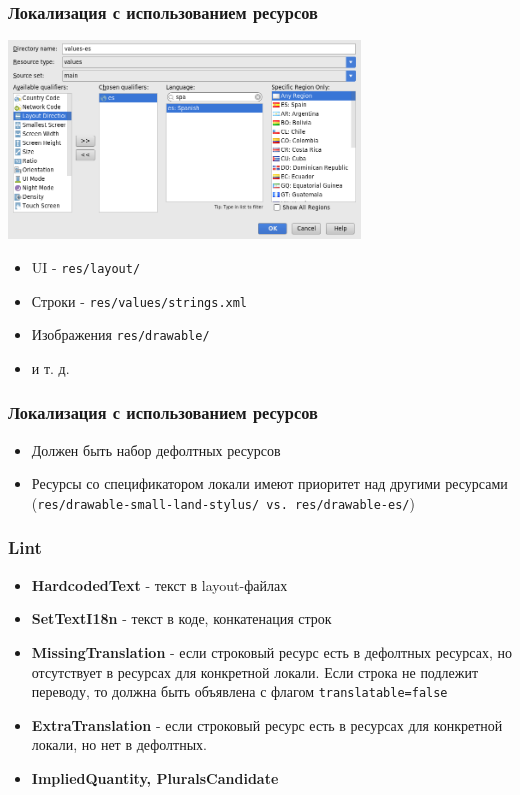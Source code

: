 \documentclass{beamer}
\begin{document}
\begin{frame}
    \frametitle{Локализация с использованием ресурсов}
    \begin{center}
        \includegraphics[width=0.7\textwidth,keepaspectratio]{images/resources}
    \end{center}
    \begin{itemize}
        \item UI - \texttt{res/layout/}
        \item Строки - \texttt{res/values/strings.xml}
        \item Изображения \texttt{res/drawable/}
        \item и т. д.
    \end{itemize}
\end{frame}

\begin{frame}
    \frametitle{Локализация с использованием ресурсов}
    \begin{itemize}
        \item Должен быть набор дефолтных ресурсов
        \item Ресурсы со спецификатором локали имеют приоритет над другими ресурсами
            (\texttt{res/drawable-small-land-stylus/ vs. res/drawable-es/})
    \end{itemize}
\end{frame}

\begin{frame}
    \frametitle{Lint}
    \begin{itemize}
        \item \textbf{HardcodedText} - текст в layout-файлах
        \item \textbf{SetTextI18n} - текст в коде, конкатенация строк
        \item \textbf{MissingTranslation} - если строковый ресурс есть в
            дефолтных ресурсах, но отсутствует в ресурсах для конкретной
            локали. Если строка не подлежит переводу, то
            должна быть объявлена с флагом \texttt{translatable=false}
        \item \textbf{ExtraTranslation} - если строковый ресурс есть в ресурсах
			для конкретной локали, но нет в дефолтных.
        \item \textbf{ImpliedQuantity, PluralsCandidate}
    \end{itemize}
\end{frame}
\end{document}
